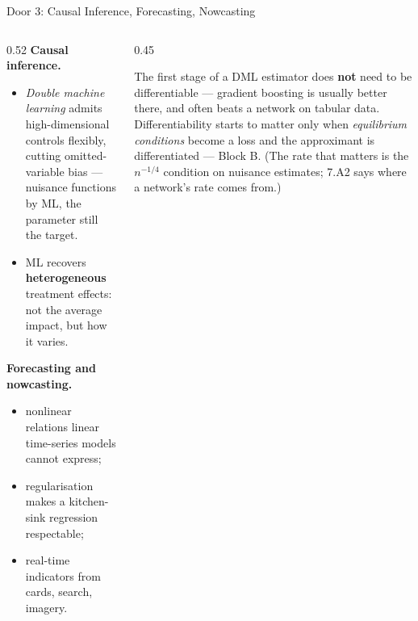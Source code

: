 \begin{frame}{Door 3: Causal Inference, Forecasting, Nowcasting}
\begin{columns}[T]
\begin{column}{0.52\textwidth}
\small
\textbf{Causal inference.}
\begin{itemize}\small\setlength{\itemsep}{1mm}
  \item \emph{Double machine learning} admits high-dimensional controls flexibly, cutting omitted-variable bias --- nuisance functions by ML, the parameter still the target.
  \item ML recovers \textbf{heterogeneous} treatment effects: not the average impact, but how it varies.
\end{itemize}
\medskip

\textbf{Forecasting and nowcasting.}
\begin{itemize}\small\setlength{\itemsep}{1mm}
  \item nonlinear relations linear time-series models cannot express;
  \item regularisation makes a kitchen-sink regression respectable;
  \item real-time indicators from cards, search, imagery.
\end{itemize}
\end{column}
\begin{column}{0.45\textwidth}
\begin{cautionbox}[title=\textbf{A boundary worth stating}]\small
The first stage of a DML estimator does \textbf{not} need to be differentiable --- gradient boosting is usually better there, and often beats a network on tabular data.
\medskip
Differentiability starts to matter only when \emph{equilibrium conditions} become a loss and the approximant is differentiated --- Block B. (The rate that matters is the $n^{-1/4}$ condition on nuisance estimates; 7.A2 says where a network's rate comes from.)
\end{cautionbox}
\end{column}
\end{columns}
\end{frame}

